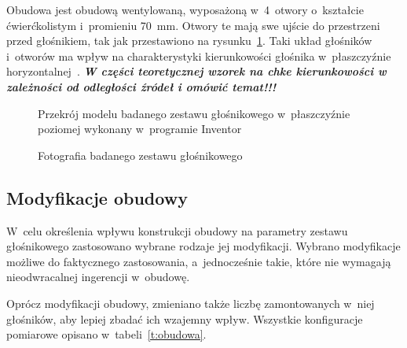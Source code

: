 \documentclass[12pt]{oska}
\newcommand{\comment}[1]{{\color{magenta}\emph{\textbf{#1}}}}
\begin{document}
		Obudowa jest obudową wentylowaną, wyposażoną w~4~otwory o~kształcie ćwierćkolistym i~promieniu \SI{70}{\milli\metre}. Otwory te mają swe ujście do przestrzeni przed głośnikiem, tak jak przestawiono na rysunku~\ref{r:przekroj}. %
		Taki układ głośników i~otworów ma wpływ na charakterystyki kierunkowości głośnika w~płaszczyźnie horyzontalnej~\cite{kmiecik_inz}. \comment{W części teoretycznej wzorek na chke kierunkowości w zależności od odległości źródeł i omówić temat!!!}
		
		
		\begin{figure}[!ht]
			\centering
			\caption{Przekrój modelu badanego zestawu głośnikowego w~płaszczyźnie poziomej wykonany w~programie Inventor}
			\label{r:przekroj}
		\end{figure}
		
		\begin{figure}[!ht]
			\centering
			\caption{Fotografia badanego zestawu głośnikowego}
			\label{r:zdjecie}
		\end{figure}
	
	\subsection{Modyfikacje obudowy}
	
		W~celu określenia wpływu konstrukcji obudowy na parametry zestawu głośnikowego zastosowano wybrane rodzaje jej modyfikacji. Wybrano modyfikacje możliwe do faktycznego zastosowania, a~jednocześnie takie, które nie wymagają nieodwracalnej ingerencji w~obudowę.
		
		Oprócz modyfikacji obudowy, zmieniano także liczbę zamontowanych w~niej głośników, aby lepiej zbadać ich wzajemny wpływ. Wszystkie konfiguracje pomiarowe opisano w~tabeli~\ref{t:obudowa}.
		
\end{document}
